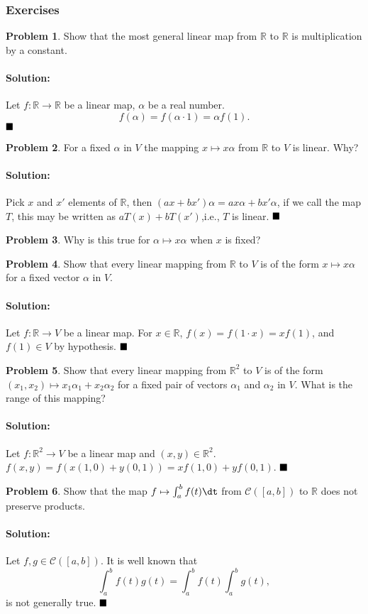 \documentclass[]{article}
\newcommand{\RR}{\mathbb{R}}
\theoremstyle{definition}
\newtheorem{problem}{Problem}
\newenvironment{solution}{\paragraph{Solution:}}{\hfill$\blacksquare \\$}
\begin{document}
\subsubsection{Exercises}
\begin{problem}
Show that the most general linear map from $\RR$ to $\RR$ is multiplication by a constant.	
\end{problem}
\begin{solution}
	Let $f: \RR \to \RR$ be a linear map, $\alpha$ be a real number.
	\[
		f(\alpha) = f(\alpha \cdot 1) = \alpha f(1).
	\]
\end{solution}
\begin{problem}
	For a fixed $\alpha$ in $V$ the mapping $x \mapsto x \alpha$ from $\RR$ to $V$ is linear. Why?
\end{problem}
\begin{solution}
	Pick $x$ and $x'$ elements of $\RR$, then $(ax + bx')\alpha = ax\alpha + bx'\alpha$, if we call the map $T$, this may be written as $aT(x) + bT(x')$,i.e., $T$ is linear.
\end{solution}
\begin{problem}
	Why is this true for $\alpha \mapsto x\alpha$ when $x$ is fixed?
\end{problem}
\begin{problem}
	Show that every linear mapping from $\RR$ to $V$ is of the form $x \mapsto x \alpha$ for a fixed vector $\alpha$ in $V$.
\end{problem}
\begin{solution}
	Let $f: \RR \to V$ be a linear map. For $x \in \RR$, $f(x) = f(1 \cdot x) = xf(1)$, and $f(1) \in V$ by hypothesis.
\end{solution}
\begin{problem}
	Show that every linear mapping from $\RR^2$ to $V$ is of the form $(x_1, x_2) \mapsto x_1\alpha_1 + x_2\alpha_2$ for a fixed pair of vectors $\alpha_1$ and $\alpha_2$ in $V$. What is the range of this mapping?
\end{problem}
\begin{solution}
	Let $f: \RR^2 \to V$ be a linear map and $(x,y) \in \RR^2$. $f(x,y) = f(x(1,0) + y(0, 1)) = xf(1,0) + yf(0,1)$.
\end{solution}
\begin{problem}
	Show that the map $f \mapsto \int_a^b f(t) \dt$ from $\mathcal{C}([a,b])$ to $\RR$ does not preserve products.
\end{problem}
\begin{solution}
	Let $f,g \in \mathcal{C}([a,b])$. It is well known that 
	\[
		\int_a^b f(t)g(t) = \int_a^b f(t) \int_a^b g(t),
	\]
	is not generally true.
\end{solution}
\end{document}

